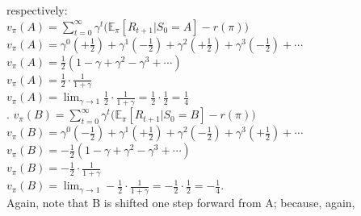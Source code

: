 \documentclass{article}
\begin{document}
respectively: 
\\
$v_{\pi}(A) = \sum_{t=0}^{\infty} \gamma^t \Big( \mathbb{E}_{\pi}[R_{t+1} | S_0 = A] - r(\pi) \Big)$\\
$v_{\pi}(A) = \gamma^0\left(+\frac{1}{2}\right) + \gamma^1\left(-\frac{1}{2}\right) + \gamma^2\left(+\frac{1}{2}\right) + \gamma^3\left(-\frac{1}{2}\right) + \cdots$\\
$v_{\pi}(A) = \frac{1}{2}\left(1 - \gamma + \gamma^2 - \gamma^3 + \cdots\right)$\\
$v_{\pi}(A) = \frac{1}{2} \cdot \frac{1}{1+\gamma}$\\
$v_{\pi}(A) = \lim_{\gamma \to 1} \frac{1}{2} \cdot \frac{1}{1+\gamma} = \frac{1}{2} \cdot \frac{1}{2} = \frac{1}{4}$\\.
$v_{\pi}(B) = \sum_{t=0}^{\infty} \gamma^t \Big( \mathbb{E}_{\pi}[R_{t+1} | S_0 = B] - r(\pi) \Big)$\\
$v_{\pi}(B) = \gamma^0\left(-\frac{1}{2}\right) + \gamma^1\left(+\frac{1}{2}\right) + \gamma^2\left(-\frac{1}{2}\right) + \gamma^3\left(+\frac{1}{2}\right) + \cdots$\\
$v_{\pi}(B) = -\frac{1}{2}\left(1 - \gamma + \gamma^2 - \gamma^3 + \cdots\right)$\\
$v_{\pi}(B) = -\frac{1}{2} \cdot \frac{1}{1+\gamma}$\\
$v_{\pi}(B) = \lim_{\gamma \to 1} -\frac{1}{2} \cdot \frac{1}{1+\gamma} = -\frac{1}{2} \cdot \frac{1}{2} = -\frac{1}{4}$.
\\

Again, note that B is shifted one step forward from A; because, again, 
\end{document}
